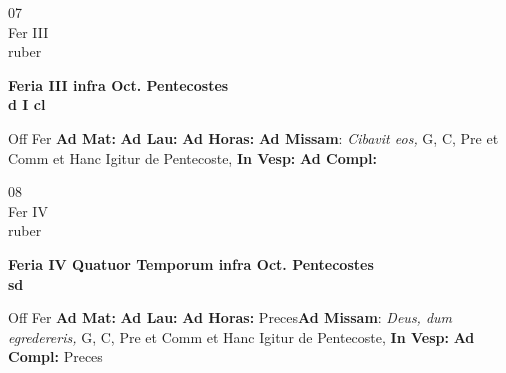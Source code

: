 \documentclass[10pt, openany]{book}
\begin{document}
        \begin{center}
            \begin{minipage}{3.5in}
                \vspace{2em}
                \begin{minipage}{0.5in}
                    {\Huge 07} \\
                    {\normalsize Fer III} \\
                    {\normalsize ruber}
                \end{minipage}
                \begin{minipage}{3.0in}
                    \textbf{ \large Feria III infra Oct. Pentecostes \\
                    \textnormal{\normalsize d I cl}} \\ 
                \end{minipage}
                \begin{justify}Off Fer
                    \textbf{Ad Mat: }
                    \textbf{Ad Lau: }
                    \textbf{Ad Horas: }\textbf{Ad Missam}: \textit{Cibavit eos,} G, C, Pre et Comm et Hanc Igitur de Pentecoste,  
                    \textbf{In Vesp: }
                    \textbf{Ad Compl: }
                \end{justify}
            \end{minipage}
        \end{center}
    
        \begin{center}
            \begin{minipage}{3.5in}
                \vspace{2em}
                \begin{minipage}{0.5in}
                    {\Huge 08} \\
                    {\normalsize Fer IV} \\
                    {\normalsize ruber}
                \end{minipage}
                \begin{minipage}{3.0in}
                    \textbf{ \large Feria IV Quatuor Temporum infra Oct. Pentecostes \\
                    \textnormal{\normalsize sd}} \\ 
                \end{minipage}
                \begin{justify}Off Fer
                    \textbf{Ad Mat: }
                    \textbf{Ad Lau: }
                    \textbf{Ad Horas: }Preces\textbf{Ad Missam}: \textit{Deus, dum egredereris,} G, C, Pre et Comm et Hanc Igitur de Pentecoste,  
                    \textbf{In Vesp: }
                    \textbf{Ad Compl: }Preces
                \end{justify}
            \end{minipage}
        \end{center}
    
\end{document}
